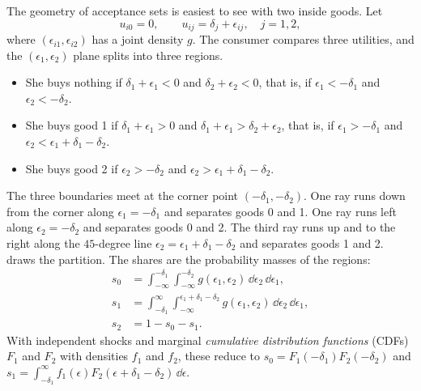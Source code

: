 The geometry of acceptance sets is easiest to see with two inside goods. Let
\begin{equation*}
u_{i0} = 0, \qquad u_{ij} = \delta_j + \epsilon_{ij}, \quad j = 1, 2,
\end{equation*}
where $(\epsilon_{i1}, \epsilon_{i2})$ has a joint density $g$. The consumer compares three utilities, and the
$(\epsilon_1, \epsilon_2)$ plane splits into three regions.
\begin{itemize}
  \item She buys nothing if $\delta_1 + \epsilon_1 < 0$ and $\delta_2 + \epsilon_2 < 0$, that is, if
  $\epsilon_1 < -\delta_1$ and $\epsilon_2 < -\delta_2$.
  \item She buys good 1 if $\delta_1 + \epsilon_1 > 0$ and $\delta_1 + \epsilon_1 > \delta_2 + \epsilon_2$, that
  is, if $\epsilon_1 > -\delta_1$ and $\epsilon_2 < \epsilon_1 + \delta_1 - \delta_2$.
  \item She buys good 2 if $\epsilon_2 > -\delta_2$ and $\epsilon_2 > \epsilon_1 + \delta_1 - \delta_2$.
\end{itemize}
The three boundaries meet at the corner point $(-\delta_1, -\delta_2)$. One ray runs down from the corner along
$\epsilon_1 = -\delta_1$ and separates goods 0 and 1. One ray runs left along $\epsilon_2 = -\delta_2$ and
separates goods 0 and 2. The third ray runs up and to the right along the $45$-degree line
$\epsilon_2 = \epsilon_1 + \delta_1 - \delta_2$ and separates goods 1 and 2.  draws the
partition. The shares are the probability masses of the regions:
\begin{align*}
s_0 &= \int_{-\infty}^{-\delta_1}\int_{-\infty}^{-\delta_2} g(\epsilon_1, \epsilon_2)\,\dd\epsilon_2\,\dd\epsilon_1, \\
s_1 &= \int_{-\delta_1}^{\infty}\int_{-\infty}^{\epsilon_1 + \delta_1 - \delta_2} g(\epsilon_1, \epsilon_2)\,\dd\epsilon_2\,\dd\epsilon_1, \\
s_2 &= 1 - s_0 - s_1 .
\end{align*}
With independent shocks and marginal \emph{cumulative distribution functions} (CDFs) $F_1$ and $F_2$ with densities
$f_1$ and $f_2$, these reduce to
$s_0 = F_1(-\delta_1)F_2(-\delta_2)$ and
$s_1 = \int_{-\delta_1}^{\infty} f_1(\epsilon)F_2(\epsilon + \delta_1 - \delta_2)\,\dd\epsilon$.

